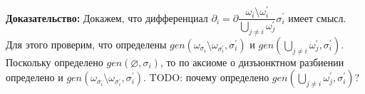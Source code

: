 \newcommand{\sigi}{\sigma_i}
\newcommand{\sigpi}{\sigma^\prime_i}
\newcommand{\alloth}{\bigcup\limits_{j \neq i}\omega^\prime_j}

\textbf{Доказательство:}
Докажем, что дифференциал $\partial_i = \partial\dfrac{\omega_i \setminus \omega_i^\prime}{\bigcup\limits_{j \neq i} \omega_j^\prime} \sigma_i^\prime$ имеет смысл. Для этого проверим, что определены $gen(\omega_{\sigi} \setminus \omega_{\sigpi}, \sigpi)$ и $gen(\alloth, \sigpi)$. Поскольку определено $gen(\varnothing, \sigi)$, то по аксиоме о дизъюнктном разбиении определено и $gen(\omega_{\sigi} \setminus \omega_{\sigpi}, \sigpi)$. TODO: почему определено $gen(\alloth, \sigpi)$?



